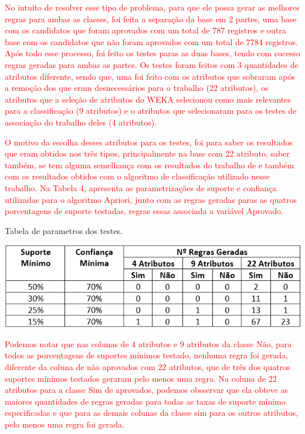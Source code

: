 \par
\textcolor{red}{No intuito de resolver esse tipo de problema, para que ele possa gerar as melhores regras para ambas as classes, foi feita a separação da base em 2 partes, uma base com os candidatos que foram aprovados com um total de 787 registros e outra base com os candidatos que não foram aprovados com um total de 7784 registros. Após todo esse processo, foi feito os testes paras as duas bases, tendo com sucesso regras geradas para ambas as partes. Os testes foram feitos com 3 quantidades de atributos diferente, sendo que, uma foi feito com os atributos que sobraram após a remoção dos que eram desnecessários para o trabalho (22 atributos), os atributos que a seleção de atributos do WEKA selecionou como mais relevantes para a classificação (9 atributos) e o atributos que  selecionaram para os testes de associação do trabalho deles (4 atributos).}

\par
\textcolor{red}{O motivo da escolha desses atributos para os testes, foi para saber os resultados que eram obtidos nos três tipos, principalmente na base com 22 atributo, saber também, se tem alguma semelhança com os resultados do trabalho de  e também com os resultados obtidos com o algoritmo de classificação utilizado nesse trabalho. Na Tabela 4, apresenta as parametrizações de suporte e confiança utilizadas para o algoritmo Apriori, junto com as regras geradas paras as quatros porcentagens de suporte testadas, regras essas associada a variável Aprovado.}


\par
\begin{table}[!htp]
	\begin{center}
    \caption{\label{fig:waveform_fig} Tabela de parametros dos testes.}
	\includegraphics[scale=0.90]{Figuras/Tabela_de_parametros_apriori.png}
	\end{center}
\end{table}

\par
\textcolor{red}{Podemos notar que nas colunas de 4 atributos e 9 atributos da classe Não, para todos as porcentagens de suportes mínimos testado, nenhuma regra foi gerada, diferente da coluna de não aprovados com 22 atributos, que de três dos quatros suportes mínimos testados geraram pelo menos uma regra. Na coluna de 22 atributos para a classe Sim de aprovados, podemos obsservar que ela obteve as maiores quantidades de regras geradas para todas as taxas de suporte mínimo especificadas e que para as demais colunas da classe sim para os outros atributos, pelo menos uma regra foi gerada.}

